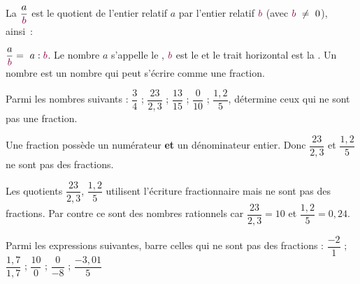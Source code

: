 

\begin{aconnaitre}
La  $\dfrac{a}{\textcolor{C1}{b}}$ est le quotient de l'entier relatif $a$ par l'entier relatif $\textcolor{C1}{b}$ (avec $\textcolor{C1}{b} \neq 0$), ainsi :

$\dfrac{a}{\textcolor{C1}{b}} = a : \textcolor{C1}{b}$. Le nombre $a$ s'appelle le , $\textcolor{C1}{b}$ est le  et le trait horizontal est la . Un nombre  est un nombre qui peut s'écrire comme une fraction.
\end{aconnaitre}


\begin{methode*1}

\begin{exemple*1}
Parmi les nombres suivants : $\dfrac{3}{4}$  ; $\dfrac{23}{2,3}$ ; $\dfrac{13}{15}$ ; $\dfrac{0}{10}$ ;   $\dfrac{1,2}{5}$, détermine ceux qui ne sont pas une fraction.

\vspace{.5em}

Une fraction possède un numérateur \textbf{et} un dénominateur entier. Donc $\dfrac{23}{2,3}$ et $\dfrac{1,2}{5}$ ne sont pas des fractions.
 \end{exemple*1}
 
\begin{remarque}
{\footnotesize Les quotients $\dfrac{23}{2,3}$, $\dfrac{1,2}{5}$ utilisent l'écriture fractionnaire mais ne sont pas des fractions. Par contre ce sont des nombres rationnels car $\dfrac{23}{2,3} = 10$ et $\dfrac{1,2}{5} = 0,24$.}
 \end{remarque}
 
  \exercice  
Parmi les expressions suivantes, barre celles qui ne sont pas des fractions :
$\dfrac{-2}{1}$  ; $\dfrac{1,7}{1,7}$ ; $\dfrac{10}{0}$ ; $\dfrac{0}{-8}$ ;   $\dfrac{-3,01}{5}$

 \end{methode*1}


